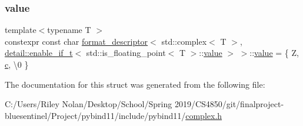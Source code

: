 \subsubsection{\texorpdfstring{value}{value}}
{\footnotesize\ttfamily template$<$typename T $>$ \\
constexpr const char \mbox{\hyperlink{structformat__descriptor}{format\+\_\+descriptor}}$<$ std\+::complex$<$ T $>$, \mbox{\hyperlink{detail_2common_8h_a012819c9e8b5e04872a271f50f8b8196}{detail\+::enable\+\_\+if\+\_\+t}}$<$ std\+::is\+\_\+floating\+\_\+point$<$ T $>$\+::\mbox{\hyperlink{_s_d_l__opengl__glext_8h_a8ad81492d410ff2ac11f754f4042150f}{value}} $>$ $>$\+::\mbox{\hyperlink{_s_d_l__opengl__glext_8h_a8ad81492d410ff2ac11f754f4042150f}{value}} = \{ \textquotesingle{}Z\textquotesingle{}, \mbox{\hyperlink{_s_d_l__opengl__glext_8h_a1f2d7f8147412c43ba2303a56f97ee73}{c}}, \textquotesingle{}\textbackslash{}0\textquotesingle{} \}\hspace{0.3cm}{\ttfamily [static]}}



The documentation for this struct was generated from the following file\+:\begin{DoxyCompactItemize}
\item 
C\+:/\+Users/\+Riley Nolan/\+Desktop/\+School/\+Spring 2019/\+C\+S4850/git/finalproject-\/bluesentinel/\+Project/pybind11/include/pybind11/\mbox{\hyperlink{complex_8h}{complex.\+h}}\end{DoxyCompactItemize}
